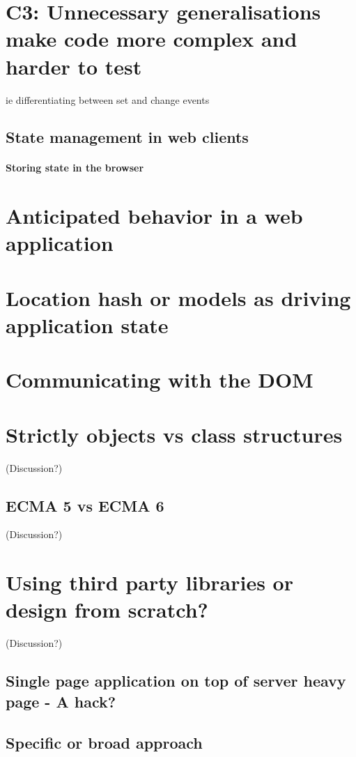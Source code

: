 \documentclass[english]{ifimaster}
\begin{document}
\section{C3: Unnecessary generalisations make code more complex and harder to test}
ie differentiating between set and change events




\subsection{State management in web clients}
\paragraph{Storing state in the browser}

\section{Anticipated behavior in a web application}
\section{Location hash or models as driving application state}

\section{Communicating with the DOM}

\section{Strictly objects vs class structures} (Discussion?)
\subsection{ECMA 5 vs ECMA 6} (Discussion?)

\section{Using third party libraries or design from scratch?} (Discussion?)

\subsection{Single page application on top of server heavy page - A hack?}
\subsection{Specific or broad approach}
\end{document}
